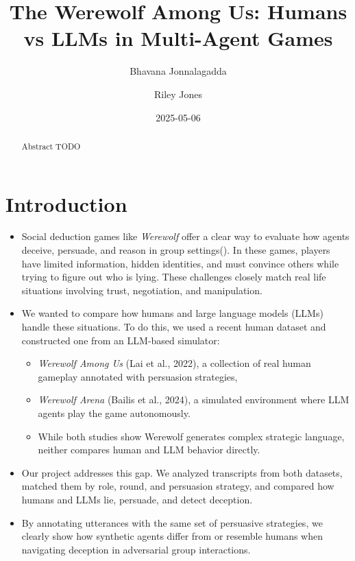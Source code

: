 \documentclass[
  letterpaper,
  DIV=11,
  numbers=noendperiod]{scrreprt}
\title{The Werewolf Among Us: Humans vs LLMs in Multi-Agent Games}
\author{Bhavana Jonnalagadda \and Riley Jones}
\date{2025-05-06}
\providecommand{\tightlist}{%
  \setlength{\itemsep}{0pt}\setlength{\parskip}{0pt}}
\renewcommand*\contentsname{Table of contents}
\newcommand\contentsname{Table of contents}
\begin{document}
\maketitle
\begin{abstract}
Abstract TODO
\end{abstract}

\renewcommand*\contentsname{Table of contents}
{
\hypersetup{linkcolor=}
\setcounter{tocdepth}{2}
\tableofcontents
}

\chapter{Introduction}\label{introduction}

\begin{itemize}
\item
  Social deduction games like \emph{Werewolf} offer a clear way to
  evaluate how agents deceive, persuade, and reason in group
  settings(). In
  these games, players have limited information, hidden identities, and
  must convince others while trying to figure out who is lying. These
  challenges closely match real life situations involving trust,
  negotiation, and manipulation.
\item
  We wanted to compare how humans and large language models (LLMs)
  handle these situations. To do this, we used a recent human dataset
  and constructed one from an LLM-based simulator:

  \begin{itemize}
  \tightlist
  \item
    \emph{Werewolf Among Us} (Lai et al., 2022), a collection of real
    human gameplay annotated with persuasion strategies,
  \item
    \emph{Werewolf Arena} (Bailis et al., 2024), a simulated environment
    where LLM agents play the game autonomously.
  \item
    While both studies show Werewolf generates complex strategic
    language, neither compares human and LLM behavior directly.
  \end{itemize}
\item
  Our project addresses this gap. We analyzed transcripts from both
  datasets, matched them by role, round, and persuasion strategy, and
  compared how humans and LLMs lie, persuade, and detect deception.
\item
  By annotating utterances with the same set of persuasive strategies,
  we clearly show how synthetic agents differ from or resemble humans
  when navigating deception in adversarial group interactions.
\end{itemize}
\end{document}
